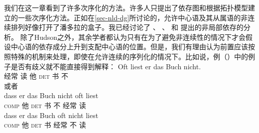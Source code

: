 我们在这一章看到了许多次序化的方法。许多人只提出了依存图和根据拓扑模型建立的一些次序化方法。正如在\ref{sec-nld-dg}所讨论的，允许中心语及其从属语的非连续排列好像打开了潘多拉的盒子。我已经讨论了 \citet{Kunze68a-u}、 \citet{Hudson97a,Hudson2000a}、 \citet*{KNR98a}和 \citet{GO2009a}提出的非局部依存的分析。
除了Hudson之外，其余学者都认为只有在为了避免非连续性的情况下才会假设中心语的依存成分上升到支配中心语的位置。但是，我们有理由认为前置应该按照特殊的机制来处理，即使在允许连续的序列化的情况下。比如说，例（）中的例子是否有歧义就不能直接得到解释：
\eal
\ex\label{ex-oft-liest-er-das-buch-nicht} 
\gll Oft liest er das Buch nicht.\\
     经常 读 他 \textsc{det}  书 不\\
\glt {} 或者\\
\ex
\gll dass er das Buch nicht oft liest\\
      \textsc{comp} 他 \textsc{det} 书 不 经常 读\\
\ex
\gll dass          er das          Buch oft nicht liest\\
     \textsc{comp} 他 \textsc{det} 书   经常  不    读\\

